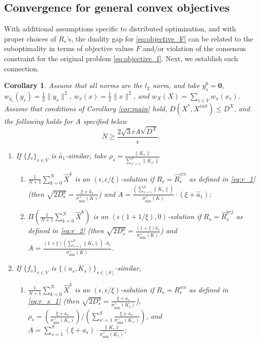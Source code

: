 \documentclass[10pt]{article}
\newcommand{\mb}{\mathbf}
\newtheorem{corollary}{Corollary}[section]
\begin{document}
\subsection{Convergence for general convex objectives}\label{sec:do-convergence}


With additional assumptions specific to distributed optimization, and with proper choices of $R_s$'s, the duality gap for \eqref{eq:objective_F} can be related to the suboptimality in terms of objective values $F$ and/or violation of the consensus constraint for the original problem \eqref{eq:objective_f}. Next, we establish such connection. 




\begin{corollary}\label{cor:main1}
Assume that all norms are the $l_2$ norm, and take $y_s^0 = \mb 0$, $w_{y_s}(y_s) = \frac{1}{2}\|y_s\|^2$, $w_x(x) = \frac{1}{2}\|x\|^2$, and $w_X(X) = \sum_{v\in V} w_x(x_v)$. Assume that conditions of Corollary \ref{cor:main} hold, $D(X^*,X^{init})\leq D^X$, and the following holds for $A$ specified below
\begin{displaymath}
     N \geq \frac{2\sqrt{3}\overline{r}A \sqrt{D^X}}{\epsilon }.
\end{displaymath}
\begin{enumerate}
    \item If $\{f_v\}_{v\in V}$ is $\widehat{a}_1$-similar, take $\rho_s =\frac{ \|K_s\|}{\sum_{s'=1}^S\|K_{s'}\|}$
    \begin{enumerate}
    \item $\frac{1}{N+1}\sum_{k=0}^N \widehat{X}^k$ is an $(\epsilon,\epsilon/\xi)$-solution if $R_s=\widehat{R}_s^{ccv}$ as defined in \eqref{eq:r_1} (then $\sqrt{2D_s^y}=\frac{\xi + \widehat{a}_1}{\sigma_{\min}^+(K)}$) and $A = \frac{(\sum_{s=1}^S\|K_s\|)}{\sigma_{\min}^+(K)}\cdot (\xi + \widehat{a}_1)$; 
\item $\Pi(\frac{1}{N+1}\sum_{k=0}^N \widehat{X}^k)$ is an $(\epsilon(1+1/\xi),0)$-solution if $R_s = \widehat{R}_s^{prj}$ as defined in \eqref{eq:r_2} (then $ \sqrt{2D_s^y}=\frac{(1+\xi) \widehat{a}_1}{\sigma_{\min}^+(K)}$) and $A= \frac{(1+\xi) (\sum_{s=1}^S \|K_s\|)\cdot \widehat{a}_1}{\sigma_{\min}^+(K)}$.
\end{enumerate}
\item If $\{f_v\}_{v\in V}$ is $\{(a_s,K_s)\}_{s\in [S]}$-similar, 
\begin{enumerate}
    \item $\frac{1}{N+1}\sum_{k=0}^N \widehat{X}^k$ is an $(\epsilon,\epsilon/\xi)$-solution if $R_s = R_s^{ccv}$ as defined in \eqref{eq:r_s_1} (then $\sqrt{2D_s^y}=\frac{\xi + a_s}{\sigma_{\min}^+(K_s)}$), $\rho_s = (\frac{\xi + a_s}{\sigma^+_{\min}(K_s)})/(\sum_{s'=1}^S \frac{\xi + a_{s'}}{\sigma^+_{\min}(K_{s'})})$, and $A=\sum_{s=1}^S (\xi + a_s)\cdot \frac{\|K_s\|}{\sigma_{\min}^+(K_s)}$; 


\end{enumerate}
\end{enumerate}
\end{corollary}
\end{document}
